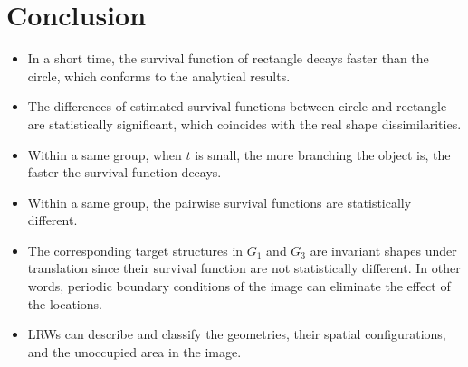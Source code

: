 
    \section{Conclusion}\label{section:branch_conclusion}

      \begin{itemize}
         \item In a short time, the survival function of rectangle decays faster than the circle, which conforms to the analytical results.
  
         \item The differences of estimated survival functions between circle and rectangle are statistically significant, which coincides with the real shape dissimilarities.

         \item Within a same group, when $t$ is small, the more branching the object is, the faster the survival function decays.

         \item Within a same group, the pairwise survival functions are statistically different.

         \item The corresponding target structures in $G_1$ and $G_3$ are invariant shapes under translation since their survival function are not statistically different. In other words, periodic boundary conditions of the image can eliminate the effect of the locations.

         \item LRWs can describe and classify the geometries, their spatial configurations, and the unoccupied area in the image.
    \end{itemize}
